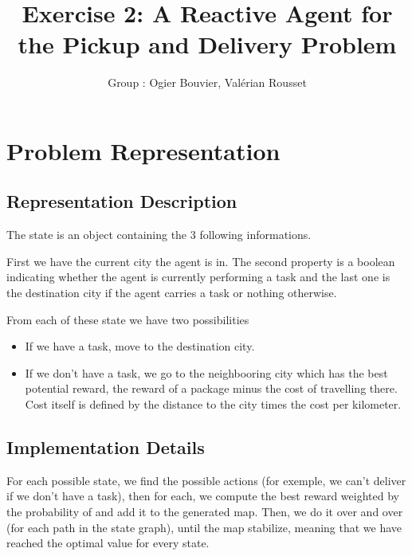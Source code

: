 \documentclass[11pt]{article}
\title{\bf Exercise 2: A Reactive Agent for the Pickup and Delivery Problem}
\author{Group \textnumero 17: Ogier Bouvier, Val\'erian Rousset}
\begin{document}
\maketitle

\section{Problem Representation}

\subsection{Representation Description}

The state is an object containing the 3 following informations.

First we have the current city the agent is in. The second property is
a boolean indicating whether the agent is currently performing a task
and the last one is the destination city if the agent carries a task
or nothing otherwise.

From each of these state we have two possibilities

\begin{itemize}
	\item If we have a task, move to the destination city.
	\item If we don't have a task, we go to the neighbooring city which
		has the best potential reward, the reward of a package minus
		the cost of travelling there. Cost itself is defined by the
		distance to the city times the cost per kilometer.
\end{itemize}

\subsection{Implementation Details}

For each possible state, we find the possible actions (for exemple, we can't
deliver if we don't have a task), then for each, we compute the best
reward weighted by the probability of  and add it to the generated
map. Then, we do it over and over (for each path in the state graph),
until the map stabilize, meaning that we have reached the optimal
value for every state.
\end{document}
